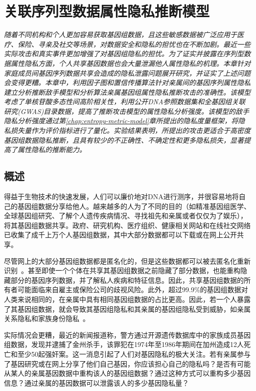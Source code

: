 \chapter{关联序列型数据属性隐私推断模型}
\label{chap:inference-attack-on-related-sequenced-data}
\textit{ }

\textit{随着不同机构和个人更加容易获取基因组数据，且这些敏感数据被广泛应用于医疗、保险、寻亲及社交等场景，对数据安全和隐私的担忧也在不断加剧。最近一些实际攻击和真实事件更加增强了对基因组隐私的担忧。为了证实并披露在序列型数据属性隐私方面，个人共享基因数据也会大量泄漏他人属性隐私的机理。本章针对家庭成员间基因序列数据共享会造成的隐私泄露问题展开研究，并证实了上述问题会变得更糟。本章中，利用因子图和置信传播算法针对亲属间的基因序列属性隐私建立分析推断敌手模型和分析算法亲属基因组属性隐私推断攻击的准确性。该模型考虑了单核苷酸多态性间高阶相关性，利用公开DNA参照数据集和全基因组关联研究(GWAS)目录数据，提高了推断攻击模型的属性隐私分析强度。该模型的敌手隐私分析强度通过第\ref{chap:entropy-metric-model}章所提出的隐私度量框架，将隐私损失量作为评价指标进行了量化。实验结果表明，所提出的攻击更适合于高密度基因组数据隐私推断，且具有较少的不正确性、不确定性和更多隐私损失，显著提高了属性隐私的推断能力。}

\section{概述}
得益于生物技术的快速发展，人们可以廉价地对DNA进行测序，并很容易地将自己的基因组数据分享给他人。越来越多的人为了不同的目的（如精准基因组医学、全球基因组研究、了解个人遗传疾病情况、寻找祖先和亲属或者仅仅为了娱乐），将其基因组数据共享。政府、研究机构、医疗组织、健康相关网站和在线社交网络已收集了成千上万个人基因组数据，其中大部分数据都可以下载或在网上公开共享。

尽管网上的大部分基因组数据都是匿名化的，但是这些数据都可以被去匿名化重新识别~\cite{greenbaum2008genomic,humbert2015de}。甚至即使一个个体在共享其基因组数据之前隐藏了部分数据，也能重构隐藏部分的基因序列数据，并了解私人疾病和特征信息。因此，共享基因组数据的所有者可能面临来自雇主或保险公司的歧视风险。此外，超过99.9\%的基因组数据对人类来说相同的，在亲属中具有相同基因组数据的占比更高。因此，若一个人暴露了其基因组数据，就会导致其基因组隐私和其亲属的基因组隐私受到威胁，如亲属关系隐私和家族身份隐私~\cite{rohlfs2012familial}。


实际情况会更糟，最近的新闻报道称，警方通过开源遗传数据库中的家族成员基因组数据，发现并逮捕了金州杀手，该罪犯在1974年至1986年期间在加州造成12人死亡和至少50起强奸案。这一消息引起了人们对基因隐私的极大关注。若有亲属参与了基因研究或在网上分享了他们自己基因，你应该担心自己的隐私吗？是否有可能从某人的亲属基因数据中重构该人的基因组数据？通过这种方式可以重构多少基因信息？通过亲属的基因数据可以泄露该人的多少基因隐私量？

